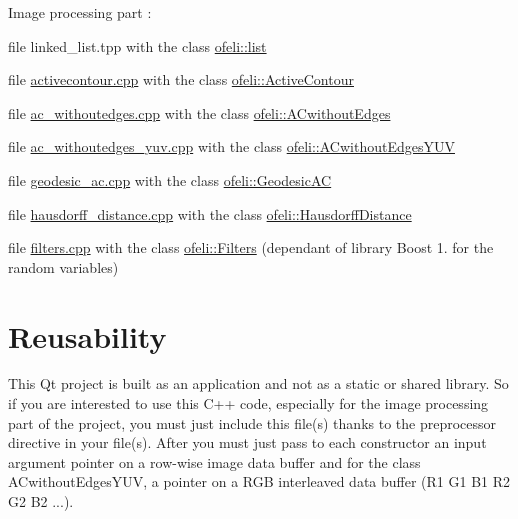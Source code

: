 Image processing part \-:
\begin{DoxyItemize}
\item file linked\-\_\-list.\-tpp with the class \hyperlink{classofeli_1_1list}{ofeli\-::list}
\item file \hyperlink{activecontour_8cpp_source}{activecontour.\-cpp} with the class \hyperlink{classofeli_1_1_active_contour}{ofeli\-::\-Active\-Contour}
\begin{DoxyItemize}
\item file \hyperlink{ac__withoutedges_8cpp_source}{ac\-\_\-withoutedges.\-cpp} with the class \hyperlink{classofeli_1_1_a_cwithout_edges}{ofeli\-::\-A\-Cwithout\-Edges}
\item file \hyperlink{ac__withoutedges__yuv_8cpp_source}{ac\-\_\-withoutedges\-\_\-yuv.\-cpp} with the class \hyperlink{classofeli_1_1_a_cwithout_edges_y_u_v}{ofeli\-::\-A\-Cwithout\-Edges\-Y\-U\-V}
\item file \hyperlink{geodesic__ac_8cpp_source}{geodesic\-\_\-ac.\-cpp} with the class \hyperlink{classofeli_1_1_geodesic_a_c}{ofeli\-::\-Geodesic\-A\-C}
\end{DoxyItemize}
\item file \hyperlink{hausdorff__distance_8cpp_source}{hausdorff\-\_\-distance.\-cpp} with the class \hyperlink{classofeli_1_1_hausdorff_distance}{ofeli\-::\-Hausdorff\-Distance}
\item file \hyperlink{filters_8cpp_source}{filters.\-cpp} with the class \hyperlink{classofeli_1_1_filters}{ofeli\-::\-Filters} (dependant of library Boost 1. for the random variables)
\end{DoxyItemize}\hypertarget{index_reusability_sec}{}\section{Reusability}\label{index_reusability_sec}
This Qt project is built as an application and not as a static or shared library. So if you are interested to use this C++ code, especially for the image processing part of the project, you must just include this file(s) thanks to the preprocessor directive in your file(s). After you must just pass to each constructor an input argument pointer on a row-\/wise image data buffer and for the class A\-Cwithout\-Edges\-Y\-U\-V, a pointer on a R\-G\-B interleaved data buffer (R1 G1 B1 R2 G2 B2 ...).

